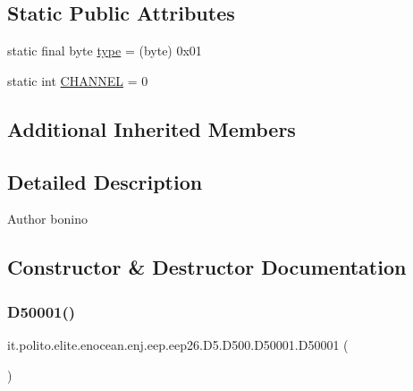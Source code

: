 \subsection*{Static Public Attributes}
\begin{DoxyCompactItemize}
\item 
static final byte \hyperlink{classit_1_1polito_1_1elite_1_1enocean_1_1enj_1_1eep_1_1eep26_1_1_d5_1_1_d500_1_1_d50001_a77848ff26d5811baa398eaaba15de97f}{type} = (byte) 0x01
\item 
static int \hyperlink{classit_1_1polito_1_1elite_1_1enocean_1_1enj_1_1eep_1_1eep26_1_1_d5_1_1_d500_1_1_d50001_ace6f32a83ca186d27d5ca5eea1942bce}{C\+H\+A\+N\+N\+EL} = 0
\end{DoxyCompactItemize}
\subsection*{Additional Inherited Members}


\subsection{Detailed Description}
\begin{DoxyAuthor}{Author}
bonino 
\end{DoxyAuthor}


\subsection{Constructor \& Destructor Documentation}
\hypertarget{classit_1_1polito_1_1elite_1_1enocean_1_1enj_1_1eep_1_1eep26_1_1_d5_1_1_d500_1_1_d50001_aa5e0d90eda0e78ca2c616237b1b536f4}{}\label{classit_1_1polito_1_1elite_1_1enocean_1_1enj_1_1eep_1_1eep26_1_1_d5_1_1_d500_1_1_d50001_aa5e0d90eda0e78ca2c616237b1b536f4} 
\subsubsection{\texorpdfstring{D50001()}{D50001()}}
{\footnotesize\ttfamily it.\+polito.\+elite.\+enocean.\+enj.\+eep.\+eep26.\+D5.\+D500.\+D50001.\+D50001 (\begin{DoxyParamCaption}{ }\end{DoxyParamCaption})}


